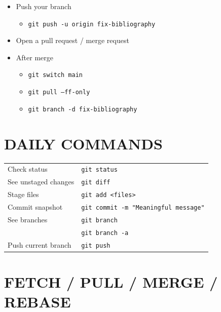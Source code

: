 \documentclass[a4paper,11pt]{article}
\begin{document}
\begin{itemize}
  \item Push your branch
    \begin{itemize}
      \renewcommand{\labelitemii}{$\triangleright$}
      \item \texttt{git push -u origin fix-bibliography}
    \end{itemize}

  \item Open a pull request / merge request

  \item After merge
    \begin{itemize}
      \renewcommand{\labelitemii}{$\triangleright$}
      \item \texttt{git switch main}
      \item \texttt{git pull --ff-only}
      \item \texttt{git branch -d fix-bibliography}
    \end{itemize}

\end{itemize}




\section*{DAILY COMMANDS}

\begin{tabular}{@{}l l@{}}
Check status            & \texttt{git status} \\
See unstaged changes    & \texttt{git diff} \\
Stage files             & \texttt{git add <files>} \\
Commit snapshot         & \texttt{git commit -m "Meaningful message"} \\
See branches            & \texttt{git branch} \\
                        & \texttt{git branch -a} \\
Push current branch     & \texttt{git push} \\
\end{tabular}

\section*{FETCH / PULL / MERGE / REBASE}
\end{document}
